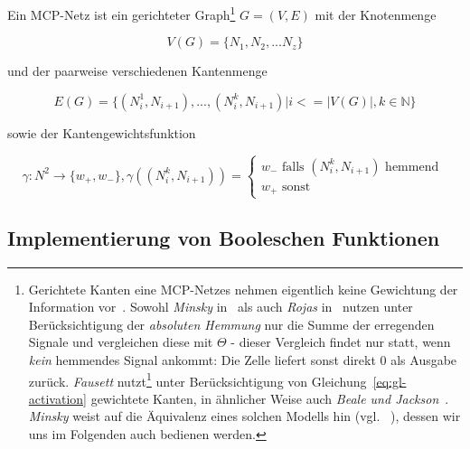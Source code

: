 \begin{definition} Ein MCP-Netz ist ein gerichteter Graph\footnote{
    Gerichtete Kanten eine MCP-Netzes nehmen eigentlich keine Gewichtung der Information vor~\cite[40]{Roj93}. Sowohl \textit{Minsky} in~\cite[34]{Min67} als auch \textit{Rojas} in~\cite[32]{Roj93} nutzen unter Berücksichtigung der \textit{absoluten Hemmung} nur die Summe der erregenden Signale und vergleichen diese mit $\Theta$ - dieser Vergleich findet nur statt, wenn \textit{kein} hemmendes Signal ankommt: Die Zelle liefert sonst direkt $0$ als Ausgabe zurück. \textit{Fausett} nutzt\footnote{
        Gewichte sind in absolut hemmenden Leitungen unsinnig nach~\cite[42]{Roj93}
    } unter Berücksichtigung von Gleichung~\ref{eq:gl-activation} gewichtete Kanten, in ähnlicher Weise auch \textit{Beale und Jackson}~\cite[41]{BJ90}. \textit{Minsky} weist auf die Äquivalenz eines solchen Modells hin (vgl. ~\cite[34 f.]{Min67}), dessen wir uns im Folgenden auch bedienen werden.
} $G = (V, E)$ mit der Knotenmenge

\begin{equation}
V(G) =\{N_1, N_2, ... N_z\}
\end{equation}

und der paarweise verschiedenen Kantenmenge

\begin{equation}
E(G) = \{ (N^1_i, N_{i+1}), ..., (N^k_i, N_{i+1}) | i <= |V(G)|, k \in \mathbb{N} \}
\end{equation}

sowie der Kantengewichtsfunktion



\begin{equation}
\gamma: N^2 \to \{w_+, w_-\}, \gamma((N^k_i, N_{i+1})) = \begin{cases}
                                                              w_- \text{ falls } (N^k_i, N_{i+1})  \text{ hemmend } \\
                                                              w_+  \text{ sonst}
\end{cases}
\end{equation}
\label{def:mcpnetz}
\end{definition}



\subsection{Implementierung von Booleschen Funktionen}\label{seq-mcpbool}

